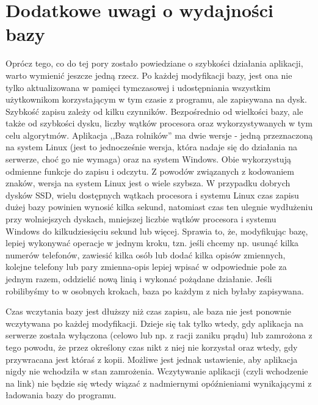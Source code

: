 \documentclass[12pt, twoside, hidelinks]{report}
\begin{document}
\section{Dodatkowe uwagi o wydajności bazy}
Oprócz tego, co do tej pory zostało powiedziane o szybkości działania aplikacji, warto wymienić jeszcze jedną rzecz. Po każdej modyfikacji bazy, jest ona nie tylko aktualizowana w pamięci tymczasowej i udostępniania wszystkim użytkownikom korzystającym w tym czasie z programu, ale zapisywana na dysk. Szybkość zapisu zależy od kilku czynników. Bezpośrednio od wielkości bazy, ale także od szybkości dysku, liczby wątków procesora oraz wykorzystywanych w tym celu algorytmów. Aplikacja ,,Baza rolników'' ma dwie wersje - jedną przeznaczoną na system Linux (jest to jednocześnie wersja, która nadaje się do działania na serwerze, choć go nie wymaga) oraz na system Windows. Obie wykorzystują odmienne funkcje do zapisu i odczytu. Z powodów związanych z kodowaniem znaków, wersja na system Linux jest o wiele szybsza. W przypadku dobrych dysków SSD, wielu dostępnych wątkach procesora i systemu Linux czas zapisu dużej bazy powinien wynosić kilka sekund, natomiast czas ten ulegnie wydłużeniu przy wolniejszych dyskach, mniejszej liczbie wątków procesora i systemu Windows do kilkudziesięciu sekund lub więcej. Sprawia to, że, modyfikując bazę, lepiej wykonywać operacje w jednym kroku, tzn. jeśli chcemy np. usunąć kilka numerów telefonów, zawiesić kilka osób lub dodać kilka opisów zmiennych, kolejne telefony lub pary zmienna-opis lepiej wpisać w odpowiednie pole za jednym razem, oddzielić nową linią i wykonać pożądane działanie. Jeśli robilibyśmy to w osobnych krokach, baza po każdym z nich byłaby zapisywana. \par
Czas wczytania bazy jest dłuższy niż czas zapisu, ale baza nie jest ponownie wczytywana po każdej modyfikacji. Dzieje się tak tylko wtedy, gdy aplikacja na serwerze została wyłączona (celowo lub np. z racji zaniku prądu) lub zamrożona z tego powodu, że przez określony czas nikt z niej nie korzystał oraz wtedy, gdy przywracana jest któraś z kopii. Możliwe jest jednak ustawienie, aby aplikacja nigdy nie wchodziła w stan zamrożenia. Wczytywanie aplikacji (czyli wchodzenie na link) nie będzie się wtedy wiązać z nadmiernymi opóźnieniami wynikającymi z ładowania bazy do programu.
\end{document}
